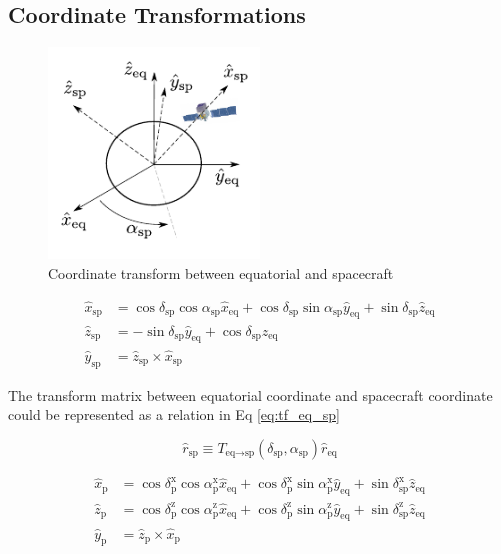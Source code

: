 \subsection{Coordinate Transformations}


\begin{figure}[h!]
    \centering
    \includegraphics[width=0.5\textwidth]{img/fig_coordinate/coord_eq_sp.pdf}
    \caption{Coordinate transform between equatorial and spacecraft}
\end{figure}

\begin{equation}
    \begin{split}
    \hat{x}_\text{sp} &= \cos\delta_\text{sp}\cos\alpha_\text{sp}\hat{x}_\text{eq} + \cos\delta_\text{sp}\sin\alpha_\text{sp}\hat{y}_\text{eq} + \sin\delta_\text{sp}\hat{z}_\text{eq}\\
    \hat{z}_\text{sp} &= - \sin\delta_\text{sp}\hat{y}_\text{eq} + \cos\delta_\text{sp}\hat{z}_\text{eq} \\
    \hat{y}_\text{sp} &= \hat{z}_\text{sp} \times \hat{x}_\text{sp}
    \end{split}
    \label{eq:tf_eq_sp}
\end{equation}

The transform matrix between equatorial coordinate and spacecraft coordinate could be represented as a relation in Eq \ref{eq:tf_eq_sp}

\begin{equation}
    \hat{r}_\text{sp} \equiv T_{\text{eq}\rightarrow\text{sp}} (\delta_\text{sp}, \alpha_\text{sp}) \hat{r}_\text{eq}
\end{equation}

\begin{equation}
    \begin{split}
    \hat{x}_\text{p} &= \cos\delta^\text{x}_\text{p}\cos\alpha^\text{x}_\text{p}\hat{x}_\text{eq} + \cos\delta^\text{x}_\text{p}\sin\alpha^\text{x}_\text{p}\hat{y}_\text{eq} + \sin\delta^\text{x}_\text{sp}\hat{z}_\text{eq}\\
    \hat{z}_\text{p} &= \cos\delta^\text{z}_\text{p}\cos\alpha^\text{z}_\text{p}\hat{x}_\text{eq} + \cos\delta^\text{z}_\text{p}\sin\alpha^\text{z}_\text{p}\hat{y}_\text{eq} + \sin\delta^\text{z}_\text{sp}\hat{z}_\text{eq}\\
    \hat{y}_\text{p} &= \hat{z}_\text{p} \times \hat{x}_\text{p}
    \end{split}
    \label{eq:tf_eq_p}
\end{equation}


